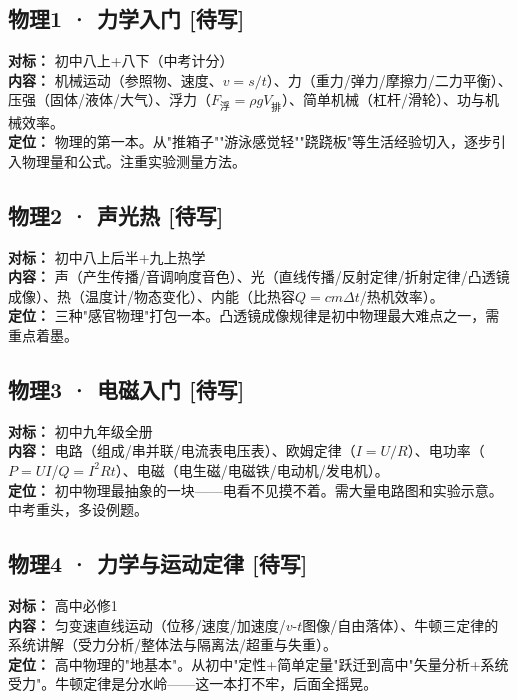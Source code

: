 \documentclass[a4paper,12pt]{ctexart}
\newcommand{\plan}{\textcolor{planblue}{\textbf{[待写]}}}
\begin{document}
\subsection*{物理1 · 力学入门 \plan}

\textbf{对标：} 初中八上+八下（中考计分）\\
\textbf{内容：} 机械运动（参照物、速度、$v = s/t$）、力（重力/弹力/摩擦力/二力平衡）、压强（固体/液体/大气）、浮力（$F_{\text{浮}} = \rho g V_{\text{排}}$）、简单机械（杠杆/滑轮）、功与机械效率。\\
\textbf{定位：} 物理的第一本。从"推箱子""游泳感觉轻""跷跷板"等生活经验切入，逐步引入物理量和公式。注重实验测量方法。

\subsection*{物理2 · 声光热 \plan}

\textbf{对标：} 初中八上后半+九上热学\\
\textbf{内容：} 声（产生传播/音调响度音色）、光（直线传播/反射定律/折射定律/凸透镜成像）、热（温度计/物态变化）、内能（比热容$Q = cm\Delta t$/热机效率）。\\
\textbf{定位：} 三种"感官物理"打包一本。凸透镜成像规律是初中物理最大难点之一，需重点着墨。

\subsection*{物理3 · 电磁入门 \plan}

\textbf{对标：} 初中九年级全册\\
\textbf{内容：} 电路（组成/串并联/电流表电压表）、欧姆定律（$I=U/R$）、电功率（$P=UI$/$Q=I^2Rt$）、电磁（电生磁/电磁铁/电动机/发电机）。\\
\textbf{定位：} 初中物理最抽象的一块——电看不见摸不着。需大量电路图和实验示意。中考重头，多设例题。

\subsection*{物理4 · 力学与运动定律 \plan}

\textbf{对标：} 高中必修1\\
\textbf{内容：} 匀变速直线运动（位移/速度/加速度/$v$-$t$图像/自由落体）、牛顿三定律的系统讲解（受力分析/整体法与隔离法/超重与失重）。\\
\textbf{定位：} 高中物理的"地基本"。从初中"定性+简单定量"跃迁到高中"矢量分析+系统受力"。牛顿定律是分水岭——这一本打不牢，后面全摇晃。
\end{document}

